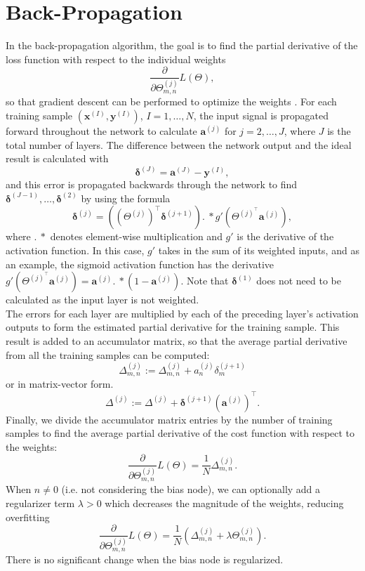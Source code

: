 \documentclass[honours,12pt]{unswthesis}
\numberwithin{equation}{section}
\theoremstyle{definition}
\begin{document}
\section{Back-Propagation}
In the back-propagation algorithm, the goal is to find the partial derivative of the loss function with respect to the individual weights \[\frac{\partial}{\partial\Theta_{m,n}^{(j)}}L(\Theta),\]
so that gradient descent can be performed to optimize the weights \citep{backprop}. For each training sample $(\bm{x}^{(I)},\bm{y}^{(I)})$, $I=1,\dots,N$, the input signal is propagated forward throughout the network to calculate $\bm{a}^{(j)}$ for $j=2,\dots,J$, where $J$ is the total number of layers. The difference between the network output and the ideal result is calculated with 
\[\bm{\delta}^{(J)}=\bm{a}^{(J)}-\bm{y}^{(I)},\] 
and this error is propagated backwards through the network to find $\bm{\delta}^{(J-1)},\dots,\bm{\delta}^{(2)}$ by using the formula 
\[\bm{\delta}^{(j)}=((\Theta^{(j)})^\top \bm{\delta}^{(j+1)}).~*g'(\Theta^{(j)^\top} \bm{a}^{(j)}),\] 
where $.~*$ denotes element-wise multiplication and $g'$ is the derivative of the activation function. In this case, $g'$ takes in the sum of its weighted inputs, and as an example, the sigmoid activation function has the derivative $g'(\Theta^{(j)^\top} \bm{a}^{(j)})=\bm{a}^{(j)}.~*(1-\bm{a}^{(j)})$. Note that $\bm{\delta}^{(1)}$ does not need to be calculated as the input layer is not weighted. \\
The errors for each layer are multiplied by each of the preceding layer's activation outputs to form the estimated partial derivative for the training sample. This result is added to an accumulator matrix, so that the average partial derivative from all the training samples can be computed:
\[\Delta^{(j)}_{m,n}:=\Delta^{(j)}_{m,n}+a_n^{(j)}\delta_m^{(j+1)}\]
or in matrix-vector form.
\[\Delta^{(j)}:=\Delta^{(j)}+\bm{\delta}^{(j+1)}(\bm{a}^{(j)})^\top.\]
Finally, we divide the accumulator matrix entries by the number of training samples to find the average partial derivative of the cost function with respect to the weights:
\[\frac{\partial}{\partial \Theta^{(j)}_{m,n}}L(\Theta)=\frac1N \Delta_{m,n}^{(j)}.\]
When $n\neq0$ (i.e. not considering the bias node), we can optionally add a regularizer term $\lambda > 0$ which decreases the magnitude of the weights, reducing overfitting \citep{DeepLearning}
\[\frac{\partial}{\partial \Theta^{(j)}_{m,n}}L(\Theta)=\frac1N (\Delta_{m,n}^{(j)}+\lambda \Theta_{m,n}^{(j)}).\]
There is no significant change when the bias node is regularized.\\
\end{document}
